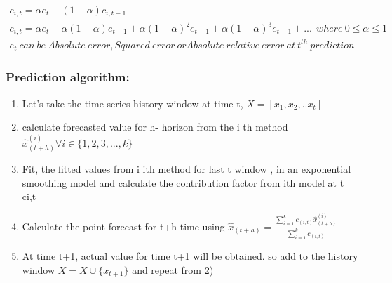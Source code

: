 \begin{multline}
c_{i,t}= \alpha e_t + (1-\alpha)c_{i,t-1} \\ 
c_{i,t}=\alpha e_t + \alpha(1-\alpha)e_{t-1}+\alpha(1-\alpha)^2e_{t-1}+\alpha(1-\alpha)^3e_{t-1}+ . .. \ \ where \ 0\leq \alpha \leq 1	\ \\
 e_{t} \ can \ be \ Absolute \ error , Squared \ error \ or Absolute \ relative \ error \ at \ t^{th} \ prediction 
\end{multline}

\subsubsection{Prediction algorithm:}

\begin{enumerate}
\item  Let's take the  time series history window at time t, $X=[x_{1},x_{2},.. x_{t}]$
\item calculate forecasted value for  h- horizon from the i th method $\hat{x}_{(t+h)}^{(i)} \forall i \in \{1,2,3,...,k\}$
\item Fit, the fitted values from i ith method for last t window ,  in an exponential smoothing model and calculate the contribution factor from ith model at t ci,t
\item Calculate the point forecast for t+h time using 
$\hat{x}_{(t+h)}= \frac{\sum_{i=1}^{k}c_{(i,t)} \hat{x}_{(t+h)}^{(i)}}{\sum_{i=1}^{k}c_{(i,t)}}$
\item At time t+1,  actual value for time t+1  will be obtained. so add  to the history window $X=X\cup \{x_{t+1}\}$ and repeat from 2)
\end{enumerate}
